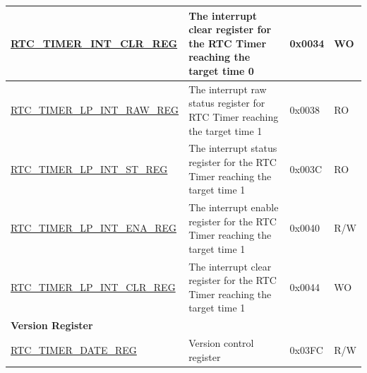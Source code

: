 \begin{longtable}{ | p{6cm} | p{7.2cm} | p{1.3cm} | p{1cm} | }
\hyperref[regdesc:RTCTIMERINTCLRREG]{RTC\_TIMER\_INT\_CLR\_REG} & The interrupt clear register for the RTC Timer reaching the target time 0 & 0x0034 & WO \\ \hline
\hyperref[regdesc:RTCTIMERLPINTRAWREG]{RTC\_TIMER\_LP\_INT\_RAW\_REG} & The interrupt raw status register for RTC Timer reaching the target time 1 & 0x0038 & RO \\ \hline
\hyperref[regdesc:RTCTIMERLPINTSTREG]{RTC\_TIMER\_LP\_INT\_ST\_REG} & The interrupt status register for the RTC Timer reaching the target time 1 & 0x003C & RO \\ \hline
\hyperref[regdesc:RTCTIMERLPINTENAREG]{RTC\_TIMER\_LP\_INT\_ENA\_REG} & The interrupt enable register for the RTC Timer reaching the target time 1 & 0x0040 & R/W \\ \hline
\hyperref[regdesc:RTCTIMERLPINTCLRREG]{RTC\_TIMER\_LP\_INT\_CLR\_REG} & The interrupt clear register for the RTC Timer reaching the target time 1 & 0x0044 & WO \\ \hline
\multicolumn{4}{|l|}{\textbf{Version Register}} \\ \hline
\hyperref[regdesc:RTCTIMERDATEREG]{RTC\_TIMER\_DATE\_REG} & Version control register & 0x03FC & R/W \\ \hline
\end{longtable}